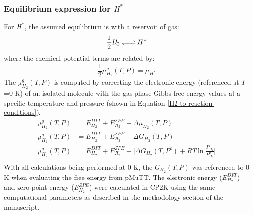\documentclass[12pt]{article}
\begin{document}
\subsubsection{Equilibrium expression for $H^{*}$}
For $H^{*}$, the assumed equilibrium is with a reservoir of  gas:
\begin{equation}
    \frac{1}{2} H_{2} \ce{<=>} H^{*}
\end{equation}
where the chemical potential terms are related by: 
\begin{equation}
    \frac{1}{2} \mu_{H_{2}}^{g}(T,P) = \mu_{H^{*}}
\end{equation}  
The $\mu_{H_{2}}^{g}(T,P)$ is computed by  correcting the electronic energy (referenced at $T$=0 K) of an isolated molecule with the gas-phase Gibbs free energy values at a specific temperature and pressure (shown in Equation \ref{H2-to-reaction-conditions}). 
\begin{equation}
    \begin{split}
         \mu_{H_{2}}^{g}(T,P) &= E_{H_{2}}^{DFT} + E_{H_{2}}^{ZPE} + \Delta \mu_{H_{2}}(T,P)  \\
         \mu_{H_{2}}^{g}(T,P) &= E_{H_{2}}^{DFT} + E_{H_{2}}^{ZPE} + \Delta G_{H_{2}}(T,P) \\ 
         \mu_{H_{2}}^{g}(T,P) &= E_{H_{2}}^{DFT} + E_{H_{2}}^{ZPE} + \Big[ \Delta G_{H_{2}}(T,P^{o})  + RT \ln{ \frac{P_{H_2}}{P_{H_2}^{o}}} \Big]  \\ 
    \end{split}
    \label{H2-to-reaction-conditions}
\end{equation}
With all calculations being performed at 0 K, the $G_{H_{2}}(T,P)$ was referenced to 0 K when evaluating the free energy from pMuTT. The electronic energy ($E_{H_{2}}^{DFT}$) and zero-point energy ($E_{H_{2}}^{ZPE}$) were calculated in CP2K using the same computational parameters as described in the methodology section of the manuscript. 
\end{document}
